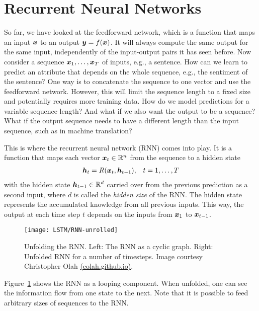 		
		
	\section{Recurrent Neural Networks}\label{sec:recurrent_neural_networks}
		\newcommand{\imagecourtesycolah}{Image courtesy Christopher Olah \mbox{\href{http://colah.github.io/}{(colah.github.io)}}.}
		So far, we have looked at the feedforward network, which is a function that maps an input $\bm{x}$ to an output $\bm{y} = f(\bm{x})$.
		It will always compute the same output for the same input, independently of the input-output pairs it has seen before.
		Now consider a sequence $\bm{x}_1, \dots, \bm{x}_T$ of inputs, e.g., a sentence.
		How can we learn to predict an attribute that depends on the whole sequence, e.g., the sentiment of the sentence?
		One way is to concatenate the sequence to one vector and use the feedforward network.
		However, this will limit the sequence length to a fixed size and potentially requires more training data.
		How do we model predictions for a variable sequence length?
		And what if we also want the output to be a sequence? 
		What if the output sequence needs to have a different length than the input sequence, such as in machine translation? 
		
		This is where the recurrent neural network (RNN) comes into play.
		It is a function that maps each vector $\bm{x}_t \in \mathbb{R}^n$ from the sequence to a hidden state
		\begin{eqnarray}
			\bm{h}_t = R(\bm{x}_t, \bm{h}_{t-1}), & &t = 1, \dots, T
		\end{eqnarray}
		with the hidden state $\bm{h}_{t-1} \in \mathbb{R}^d$ carried over from the previous prediction as a second input, where $d$ is called the \emph{hidden size} of the RNN. 
		The hidden state represents the accumulated knowledge from all previous inputs.
		This way, the output at each time step $t$ depends on the inputs from $\bm{x}_1$ to $\bm{x}_{t - 1}$.
		\begin{figure}[tb]
			\centering
			\texttt{[image: LSTM/RNN-unrolled]}
			\caption[Unfolding the RNN]
			{Unfolding the RNN. Left: The RNN as a cyclic graph. 
				Right: Unfolded RNN for a number of timesteps.
				\imagecourtesycolah}
			\label{fig:RNN-unrolled}
		\end{figure}
		Figure~\ref{fig:RNN-unrolled} shows the RNN as a looping component.
		When unfolded, one can see the information flow from one state to the next.
		Note that it is possible to feed arbitrary sizes of sequences to the RNN.
		
